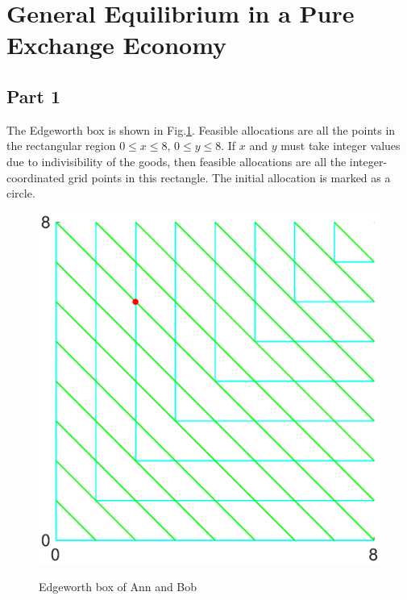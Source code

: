 \documentclass{article}
\begin{document}
\section{General Equilibrium in a Pure Exchange Economy}
\subsection{Part 1}
The Edgeworth box is shown in Fig.\ref{Edgeworth}. Feasible allocations are all the points in the rectangular region $0\leqslant x\leqslant8$, $0\leqslant y\leqslant8$. If $x$ and $y$ must take integer values due to indivisibility of the goods, then feasible allocations are all the integer-coordinated grid points in this rectangle. The initial allocation is marked as a circle.
\begin{figure}[!htbp]
	\centering
	\includegraphics[width=12cm]{figure3.eps}\\
	\caption{Edgeworth box of Ann and Bob}
	\label{Edgeworth}
\end{figure}
\end{document}
